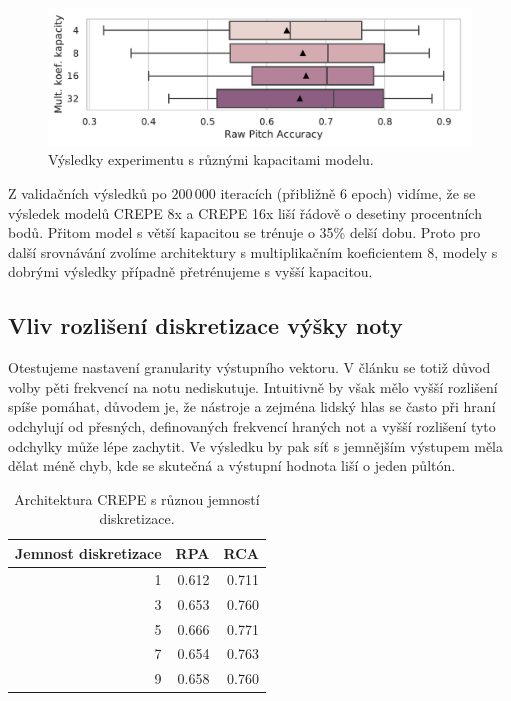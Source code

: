 \begin{figure}[h]\centering
    \includegraphics[scale=0.6]{../img/figures/crepe_kapacita.pdf}
\caption{Výsledky experimentu s různými kapacitami modelu.}
\label{obr:crepe_capacity}
\end{figure}

Z validačních výsledků po $200\,000$ iteracích (přibližně 6 epoch) vidíme, že se výsledek modelů CREPE 8x a CREPE 16x liší řádově o desetiny procentních bodů. Přitom model s větší kapacitou se trénuje o 35\% delší dobu. Proto pro další srovnávání zvolíme architektury s multiplikačním koeficientem 8, modely s dobrými výsledky případně přetrénujeme s vyšší kapacitou.

\subsection{Vliv rozlišení diskretizace výšky noty}

Otestujeme nastavení granularity výstupního vektoru. V článku \cite{Kim2018} se totiž důvod volby pěti frekvencí na notu nediskutuje. Intuitivně by však mělo vyšší rozlišení spíše pomáhat, důvodem je, že nástroje a zejména lidský hlas se často při hraní odchylují od přesných, definovaných frekvencí hraných not a vyšší rozlišení tyto odchylky může lépe zachytit. Ve výsledku by pak síť s jemnějším výstupem měla dělat méně chyb, kde se skutečná a výstupní hodnota liší o jeden půltón.


\begin{table}[h!]

\centering
    \begin{tabular}{rrr}
    \toprule
    Jemnost diskretizace &   RPA &   RCA \\
    \midrule
                    1 & 0.612 & 0.711 \\
                    3 & 0.653 & 0.760 \\
                    5 & 0.666 & 0.771 \\
                    7 & 0.654 & 0.763 \\
                    9 & 0.658 & 0.760 \\
    \bottomrule
    \end{tabular}

\caption{Architektura CREPE s různou jemností diskretizace.}\label{tab:crepe_diskretizace}

\end{table}

